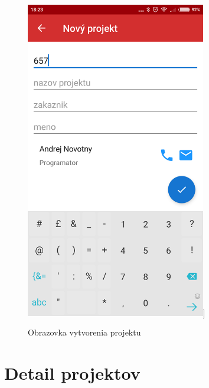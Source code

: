 \vspace{10pt}
\begin{figure}[H]

    \begin{center}
        \begin{minipage}{0.7\linewidth}
            \begin{center}
               \includegraphics[width=0.7\textwidth]{images/screenz/projekt_new.png}]   
                \caption{Obrazovka vytvorenia projektu}
                \label{obr3.7}
            \end{center}
        \end{minipage}
    \end{center}
    
\end{figure}
\vspace{10pt}
 
\section{Detail projektov}

